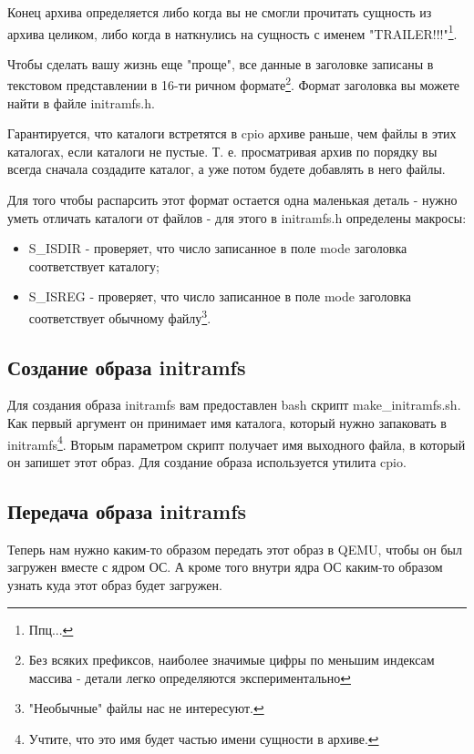 Конец архива определяется либо когда вы не смогли прочитать сущность из архива
целиком, либо когда в наткнулись на сущность с именем "TRAILER!!!"\footnote{Ппц...}.

Чтобы сделать вашу жизнь еще "проще", все данные в заголовке записаны в текстовом
представлении в 16-ти ричном формате\footnote{Без всяких префиксов, наиболее
значимые цифры по меньшим индексам массива - детали легко определяются
экспериментально}. Формат заголовка вы можете найти в файле initramfs.h.

Гарантируется, что каталоги встретятся в cpio архиве раньше, чем файлы в этих
каталогах, если каталоги не пустые. Т. е. просматривая архив по порядку вы
всегда сначала создадите каталог, а уже потом будете добавлять в него файлы.

Для того чтобы распарсить этот формат остается одна маленькая деталь - нужно
уметь отличать каталоги от файлов - для этого в initramfs.h определены макросы:

\begin{itemize}
  \item S\_ISDIR - проверяет, что число записанное в поле mode заголовка
        соответствует каталогу;
  \item S\_ISREG - проверяет, что число записанное в поле mode заголовка
        соответствует обычному файлу\footnote{"Необычные" файлы нас не интересуют.}.
\end{itemize}

\subsection{Создание образа initramfs}

Для создания образа initramfs вам предоставлен bash скрипт make\_initramfs.sh.
Как первый аргумент он принимает имя каталога, который нужно запаковать в
initramfs\footnote{Учтите, что это имя будет частью имени сущности в архиве.}.
Вторым параметром скрипт получает имя выходного файла, в который он запишет
этот образ. Для создание образа используется утилита cpio.

\subsection{Передача образа initramfs}

Теперь нам нужно каким-то образом передать этот образ в QEMU, чтобы он был
загружен вместе с ядром ОС. А кроме того внутри ядра ОС каким-то образом узнать
куда этот образ будет загружен.

